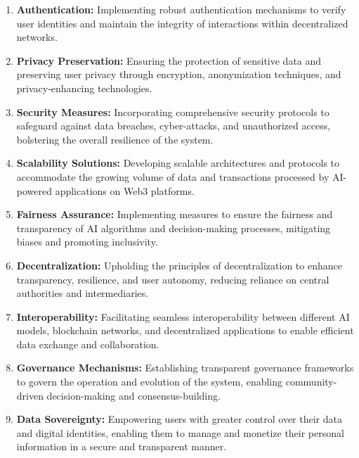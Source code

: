 \documentclass[conference]{IEEEtran}
\begin{document}
\begin{enumerate}

    \item \textbf{Authentication:} Implementing robust authentication mechanisms to verify user identities and maintain the integrity of interactions within decentralized networks.

    \item \textbf{Privacy Preservation:} Ensuring the protection of sensitive data and preserving user privacy through encryption, anonymization techniques, and privacy-enhancing technologies.

    \item \textbf{Security Measures:} Incorporating comprehensive security protocols to safeguard against data breaches, cyber-attacks, and unauthorized access, bolstering the overall resilience of the system.

    \item \textbf{Scalability Solutions:} Developing scalable architectures and protocols to accommodate the growing volume of data and transactions processed by AI-powered applications on Web3 platforms.

    \item \textbf{Fairness Assurance:} Implementing measures to ensure the fairness and transparency of AI algorithms and decision-making processes, mitigating biases and promoting inclusivity.

    \item \textbf{Decentralization:} Upholding the principles of decentralization to enhance transparency, resilience, and user autonomy, reducing reliance on central authorities and intermediaries.

    \item \textbf{Interoperability:} Facilitating seamless interoperability between different AI models, blockchain networks, and decentralized applications to enable efficient data exchange and collaboration.

    \item \textbf{Governance Mechanisms:} Establishing transparent governance frameworks to govern the operation and evolution of the system, enabling community-driven decision-making and consensus-building.

    \item \textbf{Data Sovereignty:} Empowering users with greater control over their data and digital identities, enabling them to manage and monetize their personal information in a secure and transparent manner.


\end{enumerate}
\end{document}
